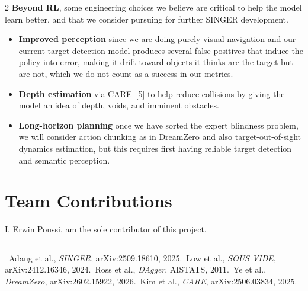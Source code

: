 \documentclass{article}
\begin{document}
\begin{multicols}{2}
\textbf{Beyond RL}, some engineering choices we believe are critical to help the model learn better, and that we consider pursuing for further SINGER development.
\begin{itemize}
\item \textbf{Improved perception} since we are doing purely visual navigation and our current target detection model produces several false positives that induce the policy into error, making it drift toward objects it thinks are the target but are not, which we do not count as a success in our metrics.
\item \textbf{Depth estimation} via CARE~[5] to help reduce collisions by giving the model an idea of depth, voids, and imminent obstacles.
\item \textbf{Long-horizon planning} once we have sorted the expert blindness problem, we will consider action chunking as in DreamZero and also target-out-of-sight dynamics estimation, but this requires first having reliable target detection and semantic perception.
\end{itemize}

\section{Team Contributions}

I, Erwin Poussi, am the sole contributor of this project.

\end{multicols}

\vspace{-0.1cm}
\noindent\rule{\textwidth}{0.4pt}
{\footnotesize\noindent [1]~Adang et al., \textit{SINGER}, arXiv:2509.18610, 2025.\;
[2]~Low et al., \textit{SOUS VIDE}, arXiv:2412.16346, 2024.\;
[3]~Ross et al., \textit{DAgger}, AISTATS, 2011.\;
[4]~Ye et al., \textit{DreamZero}, arXiv:2602.15922, 2026.\;
[5]~Kim et al., \textit{CARE}, arXiv:2506.03834, 2025.}
\end{document}
